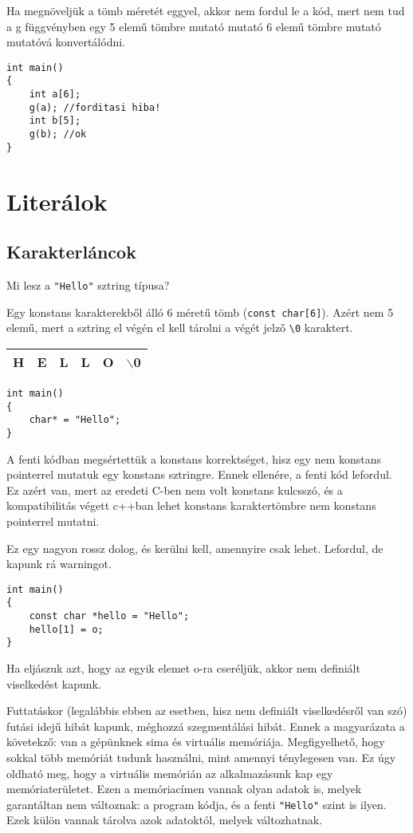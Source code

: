\documentclass[a4paper,11.5pt,table]{article}
\begin{document}
	Ha megnöveljük a tömb méretét eggyel, akkor nem fordul le a kód, mert nem tud a g függvényben egy 5 elemű tömbre mutató mutató 6 elemű tömbre mutató mutatóvá konvertálódni.
	\begin{lstlisting}
int main()
{
	int a[6];
	g(a); //forditasi hiba!
	int b[5];
	g(b); //ok
}
	\end{lstlisting}
	
	\section{Literálok}
	\subsection{Karakterláncok}
	Mi lesz a \texttt{"Hello"} sztring típusa?
	\smallskip
	
	Egy konstans karakterekből álló 6 méretű tömb (\texttt{const char[6]}). Azért nem 5 elemű, mert a sztring el végén el kell tárolni a végét jelző \texttt{\textbackslash 0} karaktert.
	
	\begin{center}
		\begin{tabular}{|c|c|c|c|c|c|}
			\hline
			H&E&L&L&O&$\backslash$0\\
			\hline
		\end{tabular}
	\end{center}
	\begin{lstlisting}
int main()
{
	char* = "Hello";
}
	\end{lstlisting}
	A fenti kódban megsértettük a konstans korrektséget, hisz egy nem konstans pointerrel mutatuk egy konstans sztringre. Ennek ellenére, a fenti kód lefordul. Ez azért van, mert az eredeti C-ben nem volt konstans kulcsszó, és a kompatibilitás végett c++ban lehet konstans karaktertömbre nem konstans pointerrel mutatni.
	\begin{note}
		Ez egy nagyon rossz dolog, és kerülni kell, amennyire csak lehet. Lefordul, de kapunk rá warningot.
	\end{note}
	\begin{lstlisting}
int main()
{
	const char *hello = "Hello";
	hello[1] = o;
}
	\end{lstlisting}
	Ha eljászuk azt, hogy az egyik elemet o-ra cseréljük, akkor nem definiált viselkedést kapunk. 
	
	Futtatáskor (legalábbis ebben az esetben, hisz nem definiált viselkedésről van szó) futási idejű hibát kapunk, méghozzá szegmentálási hibát. Ennek a magyarázata a követekző: van a gépünknek sima és virtuális memóriája. Megfigyelhető, hogy sokkal több memóriát tudunk használni, mint amennyi ténylegesen van. Ez úgy oldható meg, hogy a virtuális memórián az alkalmazásunk kap egy memóriaterületet. Ezen a memóriacímen vannak olyan adatok is, melyek garantáltan nem változnak: a program kódja, és a fenti \texttt{"Hello"} szint is ilyen. Ezek külön vannak tárolva azok adatoktól, melyek változhatnak. 
	
\end{document}
